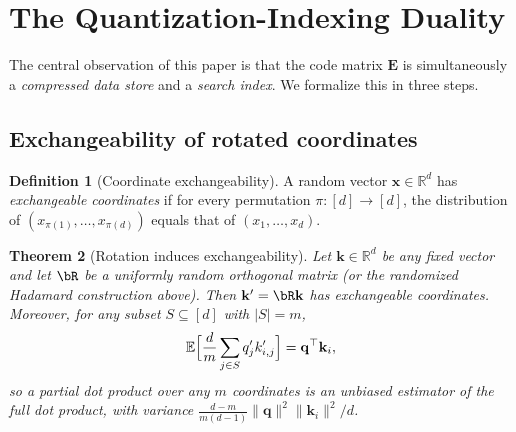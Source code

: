 \documentclass[10pt,twocolumn]{article}
\newtheorem{theorem}{Theorem}[section]
\theoremstyle{definition}
\newtheorem{definition}[theorem]{Definition}
\newcommand{\R}{\mathbb{R}}
\newcommand{\E}{\mathbb{E}}
\newcommand{\bq}{\mathbf{q}}
\newcommand{\bk}{\mathbf{k}}
\begin{document}
\section{The Quantization-Indexing Duality}
\label{sec:duality}

The central observation of this paper is that the code matrix $\mathbf{E}$ is
simultaneously a \emph{compressed data store} and a \emph{search index}.  We
formalize this in three steps.

\subsection{Exchangeability of rotated coordinates}

\begin{definition}[Coordinate exchangeability]
  \label{def:exchangeable}
  A random vector $\mathbf{x} \in \R^d$ has \emph{exchangeable coordinates} if
  for every permutation $\pi : [d] \to [d]$, the distribution of
  $(x_{\pi(1)}, \ldots, x_{\pi(d)})$ equals that of $(x_1, \ldots, x_d)$.
\end{definition}

\begin{theorem}[Rotation induces exchangeability]
  \label{thm:exchangeability}
  Let $\bk \in \R^d$ be any fixed vector and let $\bR$ be a uniformly random
  orthogonal matrix (or the randomized Hadamard construction above).  Then
  $\bk' = \bR \bk$ has exchangeable coordinates.  Moreover, for any subset
  $S \subseteq [d]$ with $|S| = m$,
  \begin{equation}
    \label{eq:partial_score_unbiased}
    \E\Bigl[\frac{d}{m} \sum_{j \in S} q'_j k'_{i,j}\Bigr]
      = \bq^\top \bk_i,
  \end{equation}
  so a partial dot product over any $m$ coordinates is an unbiased estimator of
  the full dot product, with variance $\frac{d-m}{m(d-1)} \|\bq\|^2 \|\bk_i\|^2
  / d$.
\end{theorem}
\end{document}
